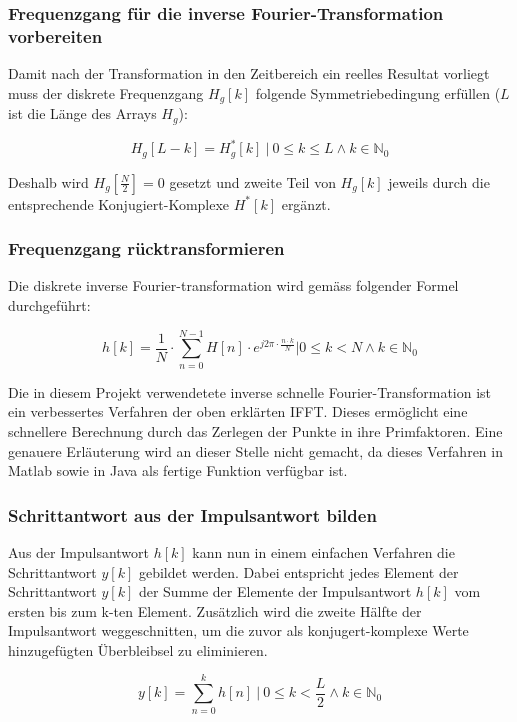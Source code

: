 \subsubsection*{Frequenzgang f\"ur die inverse Fourier-Transformation vorbereiten}
Damit nach der Transformation in den Zeitbereich ein reelles Resultat vorliegt
muss der diskrete Frequenzgang $H_g[k]$ folgende Symmetriebedingung erf\"ullen
($L$ ist die L\"ange des Arrays $H_g$):

\begin{equation*}
    H_g[L-k]=H_g^*[k]  ~\biggr \rvert~ 0 \leq k \leq L \land k \in \mathbb{N}_0
\end{equation*}

Deshalb  wird $H_g[\frac{N}{2}]  = 0$  gesetzt  und zweite  Teil von  $H_g[k]$
jeweils durch die entsprechende Konjugiert-Komplexe $H^*[k]$ erg\"anzt.

\subsubsection*{Frequenzgang r\"ucktransformieren}
Die  diskrete inverse  Fourier-transformation wird  gem\"ass folgender  Formel
durchgef\"uhrt:

\begin{equation*}
    h[k]  = \frac{1}{N}  \cdot \displaystyle\sum_{n=0}^{N-1}  H[n] \cdot
    e^{j 2\pi \cdot \frac{n \cdot k}{N}} \biggr \rvert 0 \leq k < N \land k \in \mathbb{N}_0
\end{equation*}

Die in diesem Projekt verwendetete inverse schnelle Fourier-Transformation ist
ein  verbessertes Verfahren  der oben  erkl\"arten IFFT.   Dieses erm\"oglicht
eine   schnellere  Berechnung   durch  das   Zerlegen  der   Punkte  in   ihre
Primfaktoren. Eine genauere Erl\"auterung wird an dieser Stelle nicht gemacht,
da dieses Verfahren  in Matlab sowie in Java als  fertige Funktion verf\"ugbar
ist.


\subsubsection*{Schrittantwort aus der Impulsantwort bilden}
Aus  der  Impulsantwort $h[k]$  kann  nun  in  einem einfachen  Verfahren  die
Schrittantwort  $y[k]$ gebildet  werden.  Dabei  entspricht jedes  Element der
Schrittantwort  $y[k]$ der  Summe der  Elemente der  Impulsantwort $h[k]$  vom
ersten  bis zum  k-ten Element.   Zus\"atzlich  wird die  zweite H\"alfte  der
Impulsantwort  weggeschnitten,  um  die  zuvor  als  konjugert-komplexe  Werte
hinzugef\"ugten \"Uberbleibsel zu eliminieren.

\begin{equation*}
    y[k]= \sum_{n=0}^k h[n] ~\biggr \rvert~ 0 \leq k < \frac{L}{2} \land k \in \mathbb{N}_0
\end{equation*}
